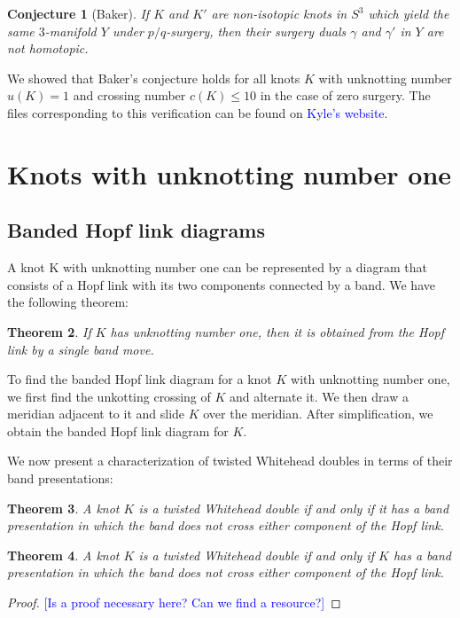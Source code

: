 \documentclass[11pt,usenames,dvipsnames,reqno]{amsart}
\newtheorem{theorem}{Theorem}
\numberwithin{theorem}{section}
\newtheorem{conjecture}[theorem]{Conjecture}
\theoremstyle{ex}
\theoremstyle{rem}
\def\kh#1{\textcolor{Blue}{#1}}
\begin{document}
\begin{conjecture}[Baker] If $K$ and $K'$ are non-isotopic knots in $S^3$ which yield the same $3$-manifold $Y$ under $p/q$-surgery, then their surgery duals $\gamma$ and $\gamma'$ in $Y$ are not homotopic.
\end{conjecture}

We showed that Baker's conjecture holds for all knots $K$ with unknotting number $u(K) = 1$ and crossing number $c(K) \leq 10$ in the case of zero surgery. The files corresponding to this verification can be found on \kh{Kyle's website}.


\section{Knots with unknotting number one}\label{sec:unknotting-one}


\subsection{Banded Hopf link diagrams} A knot K with unknotting number one can be represented by a diagram that consists of a Hopf link with its two components connected by a band. We have the following theorem:

\begin {theorem} If $K$ has unknotting number one, then it is obtained from the Hopf link by a single band move.
\end{theorem}

To find the banded Hopf link diagram for a knot $K$ with unknotting number one, we first find the unkotting crossing of $K$ and alternate it. We then draw a meridian adjacent to it and slide $K$ over the meridian. After simplification, we obtain the banded Hopf link diagram for $K$. 

We now present a characterization of twisted Whitehead doubles in terms of their band presentations:


\begin{theorem}\label{thm:twd} A knot $K$ is a twisted Whitehead double if and only if it has a band presentation in which the band does not cross either component of the Hopf link.

\end{theorem}

\begin{theorem}\label{thm:twd} A knot $K$ is a twisted Whitehead double if and only if $K$ has a band presentation in which the band does not cross either component of the Hopf link.

\end{theorem}
\begin{proof}
	\kh{[Is a proof necessary here? Can we find a resource?]}
\end{proof}
\end{document}
